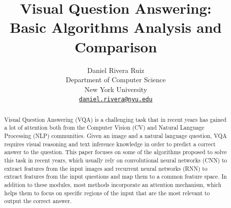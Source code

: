 \documentclass{article}
\title{Visual Question Answering:\\Basic Algorithms Analysis and Comparison}
\author{
  Daniel Rivera Ruiz\\
  Department of Computer Science\\
  New York University\\
  \href{mailto:drr342@nyu.edu}{\texttt{daniel.rivera@nyu.edu}}\\
}
\begin{document}

\maketitle

\begin{abstract}
Visual Question Answering (VQA) is a challenging task that in recent years has gained a lot of attention both from the Computer Vision (CV) and Natural Language Processing (NLP) communities. Given an image and a natural language question, VQA requires visual reasoning and text inference knowledge in order to predict a correct answer to the question. This paper focuses on some of the algorithms proposed to solve this task in recent years, which usually rely on convolutional neural networks (CNN) to extract features from the input images and recurrent neural networks (RNN) to extract features from the input questions and map them to a common feature space. In addition to these modules, most methods incorporate an attention mechanism, which helps them to focus on specific regions of the input that are the most relevant to output the correct answer.
\end{abstract}
\end{document}
